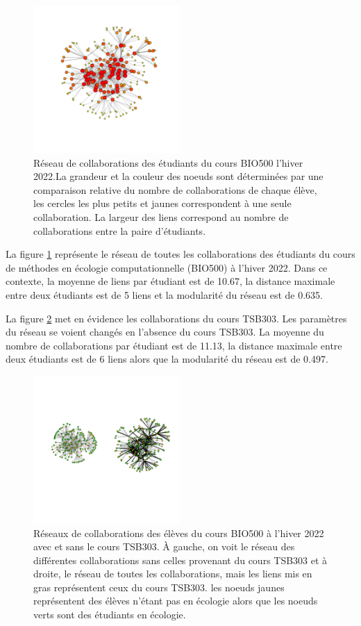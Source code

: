 \documentclass[9pt,twocolumn,twoside,]{pnas-new}
\begin{document}
\begin{figure}
\centering
\includegraphics[width=0.5\textwidth,height=0.4\textheight]{"../results/figure1.png"}
\caption{Réseau de collaborations des étudiants du cours BIO500 l'hiver
2022.La grandeur et la couleur des noeuds sont déterminées par une
comparaison relative du nombre de collaborations de chaque élève, les
cercles les plus petits et jaunes correspondent à une seule
collaboration. La largeur des liens correspond au nombre de
collaborations entre la paire d'étudiants. \label{fig:plot1}}
\end{figure}

La figure \ref{fig:plot1} représente le réseau de toutes les
collaborations des étudiants du cours de méthodes en écologie
computationnelle (BIO500) à l'hiver 2022. Dans ce contexte, la moyenne
de liens par étudiant est de 10.67, la distance maximale entre deux
étudiants est de 5 liens et la modularité du réseau est de 0.635.

La figure \ref{fig:plot2} met en évidence les collaborations du cours
TSB303. Les paramètres du réseau se voient changés en l'absence du cours
TSB303. La moyenne du nombre de collaborations par étudiant est de
11.13, la distance maximale entre deux étudiants est de 6 liens alors
que la modularité du réseau est de 0.497.

\begin{figure}
\centering
\includegraphics[width=0.5\textwidth,height=0.4\textheight]{"../results/figure2.png"}
\caption{Réseaux de collaborations des élèves du cours BIO500 à l'hiver
2022 avec et sans le cours TSB303. À gauche, on voit le réseau des
différentes collaborations sans celles provenant du cours TSB303 et à
droite, le réseau de toutes les collaborations, mais les liens mis en
gras représentent ceux du cours TSB303. les noeuds jaunes représentent
des élèves n'étant pas en écologie alors que les noeuds verts sont des
étudiants en écologie.\label{fig:plot2}}
\end{figure}
\end{document}
